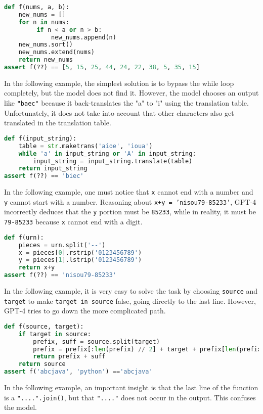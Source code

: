 \begin{lstlisting}[language=python]
def f(nums, a, b):
    new_nums = []
    for n in nums:
         if n < a or n > b:
             new_nums.append(n)
    new_nums.sort()
    new_nums.extend(nums)
    return new_nums
assert f(??) == [5, 15, 25, 44, 24, 22, 38, 5, 35, 15]
\end{lstlisting}

In the following example, the simplest solution is to bypass the while loop completely, but the model does not find it. However, the model chooses an output like \texttt{"baec"} because it back-translates the "a" to "i" using the translation table. Unfortunately, it does not take into account that other characters also get translated in the translation table.
\begin{lstlisting}[language=python]
def f(input_string):
    table = str.maketrans('aioe', 'ioua')
    while 'a' in input_string or 'A' in input_string:
        input_string = input_string.translate(table)
    return input_string
assert f(??) == 'biec'
\end{lstlisting}

In the following example, one must notice that \texttt{x} cannot end with a number and \texttt{y} cannot start with a number. Reasoning about \texttt{x+y = 'nisou79-85233'}, GPT-4 incorrectly deduces that the \texttt{y} portion must be \texttt{85233}, while in reality, it must be \texttt{79-85233} because \texttt{x} cannot end with a digit. 

\begin{lstlisting}[language=python]
def f(urn):
    pieces = urn.split('--')
    x = pieces[0].rstrip('0123456789')
    y = pieces[1].lstrip('0123456789')
    return x+y
assert f(??) == 'nisou79-85233'
\end{lstlisting}

In the following example, it is very easy to solve the task by choosing \texttt{source} and \texttt{target} to make \texttt{target in source} false, going directly to the last line. However, GPT-4 tries to go down the more complicated path.
\begin{lstlisting}[language=python]
def f(source, target):
    if target in source:
        prefix, suff = source.split(target)
        prefix = prefix[:len(prefix) // 2] + target + prefix[len(prefix) // 2:]
        return prefix + suff
    return source
assert f('abcjava', 'python') =='abcjava'
\end{lstlisting}

In the following example, an important insight is that the last line of the function is a \texttt{"....".join()}, but that \texttt{"...."} does not occur in the output. This confuses the model.

